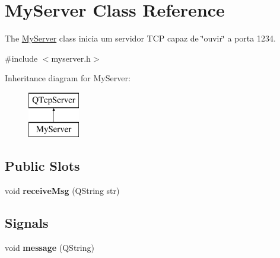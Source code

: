 \hypertarget{class_my_server}{}\section{My\+Server Class Reference}
\label{class_my_server}


The \mbox{\hyperlink{class_my_server}{My\+Server}} class inicia um servidor T\+CP capaz de \char`\"{}ouvir\char`\"{} a porta 1234.  




{\ttfamily \#include $<$myserver.\+h$>$}

Inheritance diagram for My\+Server\+:\begin{figure}[H]
\begin{center}
\leavevmode
\includegraphics[height=2.000000cm]{class_my_server}
\end{center}
\end{figure}
\subsection*{Public Slots}
\begin{DoxyCompactItemize}
\item 
\mbox{\label{class_my_server_ac795ee6f1607c0fa4e635a0da2bf2164}} 
void {\bfseries receive\+Msg} (Q\+String str)
\end{DoxyCompactItemize}
\subsection*{Signals}
\begin{DoxyCompactItemize}
\item 
\mbox{\label{class_my_server_a2b884bce37840b1b461363a37b463b30}} 
void {\bfseries message} (Q\+String)
\end{DoxyCompactItemize}
